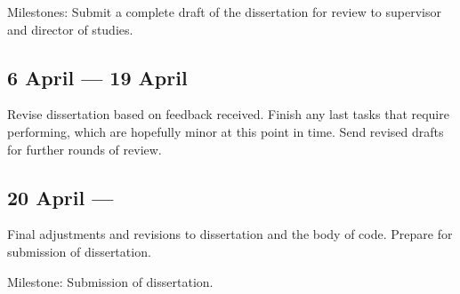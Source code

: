 Milestones: Submit a complete draft of the dissertation for review to
supervisor and director of studies.

\subsection*{6 April --- 19 April}

Revise dissertation based on feedback received. Finish any last tasks that
require performing, which are hopefully minor at this point in time. Send
revised drafts for further rounds of review.

\subsection*{20 April ---}

Final adjustments and revisions to dissertation and the body of code. Prepare
for submission of dissertation.

Milestone: Submission of dissertation.
